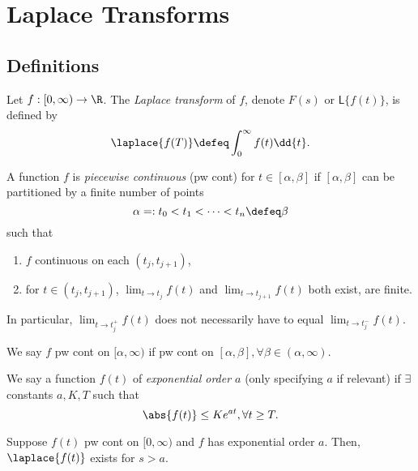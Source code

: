 \section{Laplace Transforms}

\subsection{Definitions}

\begin{definition}
    Let $f : [0, \infty) \to \R$. The \emph{Laplace transform} of $f$, denote $F(s)$ or $\mathsf{L}\{f(t)\}$, is defined by \[
    \laplace{f(T)} \defeq \int_0^\infty f(t) \dd{t}.
    \]
\end{definition}

\begin{definition}
    A function $f$ is \emph{piecewise continuous} (pw cont) for $t \in [\alpha, \beta]$ if $[\alpha, \beta]$ can be partitioned by a finite number of points \[
    \alpha =: t_0 < t_1 < \cdots < t_n \defeq \beta    
    \]
    such that \begin{enumerate}[label=(\roman*)]
        \item $f$ continuous on each $(t_j, t_{j+1})$,
        \item for $t \in (t_j, t_{j+1})$, $\lim_{t \to t_j} f(t)$ and $\lim_{t \to t_{j+1}} f(t)$ both exist, are finite.
    \end{enumerate}
    In particular, $\lim_{t \to t_j^+} f(t)$ does not necessarily have to equal $\lim_{t \to t_j^-} f(t)$.

    We say $f$ pw cont on $[\alpha, \infty)$ if pw cont on $[\alpha, \beta], \forall \beta \in (\alpha, \infty)$.
\end{definition}

\begin{definition}
    We say a function $f(t)$ of \emph{exponential order $a$} (only specifying $a$ if relevant) if $\exists$ constants $a, K, T$ such that \[
    \abs{f(t)    } \leq K e^{at},  \forall t \geq T.
    \]
\end{definition}

\begin{theorem}
    Suppose $f(t)$ pw cont on $[0, \infty)$ and $f$ has exponential order $a$. Then, $\laplace{f(t)}$ exists for $s > a$.
\end{theorem}

